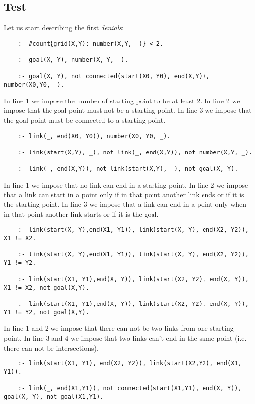 \subsection{Test}
Let us start describing the first \emph{denials}:

\begin{verbatim}
    :- #count{grid(X,Y): number(X,Y, _)} < 2. 

    :- goal(X, Y), number(X, Y, _). 
    
    :- goal(X, Y), not connected(start(X0, Y0), end(X,Y)), number(X0,Y0, _). 
\end{verbatim}

In line 1 we impose the number of starting point to be at least 2. In line 2 we impose that the goal point must not be a starting point.
In line 3 we impose that the goal point must be connected to a starting point.


\begin{verbatim}
    :- link(_, end(X0, Y0)), number(X0, Y0, _).

    :- link(start(X,Y), _), not link(_, end(X,Y)), not number(X,Y, _).
    
    :- link(_, end(X,Y)), not link(start(X,Y), _), not goal(X, Y). 
\end{verbatim}
In line 1 we impose that no link can end in a starting point. In line 2 we impose that a link can start in a point only if in that point another link ends or if it is the starting point. In line 3 we impose that a link can end in a point only when in that point another link starts or if it is the goal.


\begin{verbatim}
    :- link(start(X, Y),end(X1, Y1)), link(start(X, Y), end(X2, Y2)), X1 != X2. 

    :- link(start(X, Y),end(X1, Y1)), link(start(X, Y), end(X2, Y2)), Y1 != Y2. 
    
    :- link(start(X1, Y1),end(X, Y)), link(start(X2, Y2), end(X, Y)), X1 != X2, not goal(X,Y). 
    
    :- link(start(X1, Y1),end(X, Y)), link(start(X2, Y2), end(X, Y)), Y1 != Y2, not goal(X,Y). 
\end{verbatim}

In line 1 and 2 we impose that there can not be two links from one starting point. In line 3 and 4 we impose that two links can't end in the same point (i.e. there can not be intersections).
\begin{verbatim}
    :- link(start(X1, Y1), end(X2, Y2)), link(start(X2,Y2), end(X1, Y1)).

    :- link(_, end(X1,Y1)), not connected(start(X1,Y1), end(X, Y)), goal(X, Y), not goal(X1,Y1). 
\end{verbatim}

